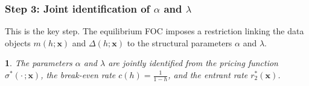 \documentclass[12pt]{article}
\theoremstyle{plain}
\theoremstyle{plain}
\newtheorem{prop}[thm]{\protect\propositionname}
\theoremstyle{definition}  %
\theoremstyle{remark}  %
\providecommand{\propositionname}{Proposition}
\begin{document}
\subsubsection{Step 3: Joint identification of $\alpha$ and $\lambda$}

This is the key step. The equilibrium FOC imposes a restriction linking the data objects $m(h;\mathbf{x})$ and $\Delta(h;\mathbf{x})$ to the structural parameters $\alpha$ and $\lambda$.

\begin{prop}\label{prop:id_alpha_lambda}
The parameters $\alpha$ and $\lambda$ are jointly identified from the pricing function $\sigma^*(\cdot\,;\mathbf{x})$, the break-even rate $c(h) = \frac{1}{1-h}$, and the entrant rate $r_2^*(\mathbf{x})$.
\end{prop}
\end{document}
